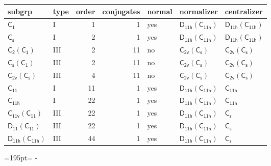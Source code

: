 \documentclass[10pt,a4paper]{article}
\newcommand{\needspace}[1]{\par\penalty-100\begingroup\dimen0=#1\relax\dimen2=\pagegoal
  \advance\dimen2-\pagetotal\ifdim\dimen0>\dimen2\relax\ifdim\dimen2>0pt\vfil\break\fi\fi
  \endgroup}
\numberwithin{equation}{section}
\newcommand{\grp}[1]{\mathsf{#1}}
\begin{document}
{\small\begin{longtable}{@{}llrrlll@{}}\toprule
subgrp & type & order & conjugates & normal & normalizer & centralizer\\\midrule\endhead
\bottomrule\endfoot\endlastfoot
\href{../../../rotation/data/pdf/C1.pdf}{$\grp{C_{1}}$} & I & 1 & 1 & yes & \href{D11h-C11h.pdf}{$\grp{D_{11h}}(\grp{C_{11h}})$} & \href{D11h-C11h.pdf}{$\grp{D_{11h}}(\grp{C_{11h}})$}\\*
\href{../../../rotation/data/pdf/C1v.pdf}{$\grp{C_{s}}$} & I & 2 & 1 & yes & \href{D11h-C11h.pdf}{$\grp{D_{11h}}(\grp{C_{11h}})$} & \href{D11h-C11h.pdf}{$\grp{D_{11h}}(\grp{C_{11h}})$}\\*
\href{C2-C1.pdf}{$\grp{C_{2}}(\grp{C_{1}})$} & III & 2 & 11 & no & \href{C2v-C1v.pdf}{$\grp{C_{2v}}(\grp{C_{s}})$} & \href{C2v-C1v.pdf}{$\grp{C_{2v}}(\grp{C_{s}})$}\\*
\href{C1v-C1.pdf}{$\grp{C_{s}}(\grp{C_{1}})$} & III & 2 & 11 & no & \href{C2v-C1v.pdf}{$\grp{C_{2v}}(\grp{C_{s}})$} & \href{C2v-C1v.pdf}{$\grp{C_{2v}}(\grp{C_{s}})$}\\*
\href{C2v-C1v.pdf}{$\grp{C_{2v}}(\grp{C_{s}})$} & III & 4 & 11 & no & \href{C2v-C1v.pdf}{$\grp{C_{2v}}(\grp{C_{s}})$} & \href{C2v-C1v.pdf}{$\grp{C_{2v}}(\grp{C_{s}})$}\\*
\href{../../../rotation/data/pdf/C11.pdf}{$\grp{C_{11}}$} & I & 11 & 1 & yes & \href{D11h-C11h.pdf}{$\grp{D_{11h}}(\grp{C_{11h}})$} & \href{../../../rotation/data/pdf/C11h.pdf}{$\grp{C_{11h}}$}\\*
\href{../../../rotation/data/pdf/C11h.pdf}{$\grp{C_{11h}}$} & I & 22 & 1 & yes & \href{D11h-C11h.pdf}{$\grp{D_{11h}}(\grp{C_{11h}})$} & \href{../../../rotation/data/pdf/C11h.pdf}{$\grp{C_{11h}}$}\\*
\href{C11v-C11.pdf}{$\grp{C_{11v}}(\grp{C_{11}})$} & III & 22 & 1 & yes & \href{D11h-C11h.pdf}{$\grp{D_{11h}}(\grp{C_{11h}})$} & \href{../../../rotation/data/pdf/C1v.pdf}{$\grp{C_{s}}$}\\*
\href{D11-C11.pdf}{$\grp{D_{11}}(\grp{C_{11}})$} & III & 22 & 1 & yes & \href{D11h-C11h.pdf}{$\grp{D_{11h}}(\grp{C_{11h}})$} & \href{../../../rotation/data/pdf/C1v.pdf}{$\grp{C_{s}}$}\\*
\href{D11h-C11h.pdf}{$\grp{D_{11h}}(\grp{C_{11h}})$} & III & 44 & 1 & yes & \href{D11h-C11h.pdf}{$\grp{D_{11h}}(\grp{C_{11h}})$} & \href{../../../rotation/data/pdf/C1v.pdf}{$\grp{C_{s}}$}\\
\bottomrule\end{longtable}}
\needspace{195pt}
\end{document}
